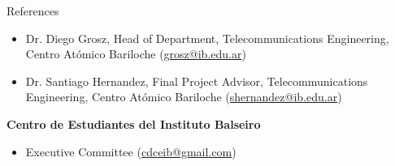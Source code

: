 \documentclass{resume} %
\begin{document}
\begin{rSection}{References}
\begin{enumerate}[label={[\arabic*]}]
\begin{itemize}
                  \item Dr. Diego Grosz, Head of Department, Telecommunications Engineering, Centro Atómico Bariloche (\href{mailto:grosz@ib.edu.ar}{grosz@ib.edu.ar})
                  \item Dr. Santiago Hernandez, Final
                        Project Advisor,  Telecommunications  Engineering,  Centro  Atómico Bariloche (\href{mailto:shernandez@ib.edu.ar}{shernandez@ib.edu.ar})
              \end{itemize}
        \item \label{ceib} \textbf{Centro de Estudiantes del Instituto Balseiro}
              \begin{itemize}
                  \item Executive Committee (\href{mailto:cdceib@gmail.com}{cdceib@gmail.com})
              \end{itemize}
    \end{enumerate}

\end{rSection}

\end{document}
